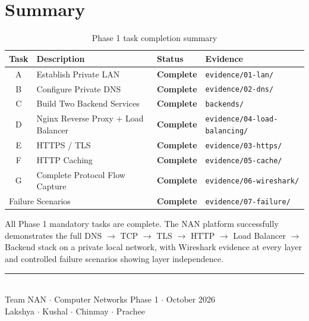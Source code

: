 \documentclass[12pt,a4paper]{article}
\begin{document}
\section{Summary}

\begin{table}[h!]
\centering
\caption{Phase 1 task completion summary}
\begin{tabular}{clll}
\toprule
\textbf{Task} & \textbf{Description} & \textbf{Status} & \textbf{Evidence} \\
\midrule
A & Establish Private LAN & \textcolor{nangreen}{\textbf{Complete}} & \texttt{evidence/01-lan/} \\
B & Configure Private DNS & \textcolor{nangreen}{\textbf{Complete}} & \texttt{evidence/02-dns/} \\
C & Build Two Backend Services & \textcolor{nangreen}{\textbf{Complete}} & \texttt{backends/} \\
D & Nginx Reverse Proxy + Load Balancer & \textcolor{nangreen}{\textbf{Complete}} & \texttt{evidence/04-load-balancing/} \\
E & HTTPS / TLS & \textcolor{nangreen}{\textbf{Complete}} & \texttt{evidence/03-https/} \\
F & HTTP Caching & \textcolor{nangreen}{\textbf{Complete}} & \texttt{evidence/05-cache/} \\
G & Complete Protocol Flow Capture & \textcolor{nangreen}{\textbf{Complete}} & \texttt{evidence/06-wireshark/} \\
\midrule
\multicolumn{2}{l}{Failure Scenarios} & \textcolor{nangreen}{\textbf{Complete}} & \texttt{evidence/07-failure/} \\
\bottomrule
\end{tabular}
\end{table}

All Phase 1 mandatory tasks are complete. The NAN platform successfully demonstrates the full DNS $\rightarrow$ TCP $\rightarrow$ TLS $\rightarrow$ HTTP $\rightarrow$ Load Balancer $\rightarrow$ Backend stack on a private local network, with Wireshark evidence at every layer and controlled failure scenarios showing layer independence.

\vfill
\begin{center}
\textcolor{nangray}{\rule{0.5\linewidth}{0.4pt}}\\[0.5em]
{\small \textcolor{nangray}{Team NAN $\cdot$ Computer Networks Phase 1 $\cdot$ October 2026}}\\
{\small \textcolor{nangray}{Lakshya $\cdot$ Kushal $\cdot$ Chinmay $\cdot$ Prachee}}
\end{center}
\end{document}
